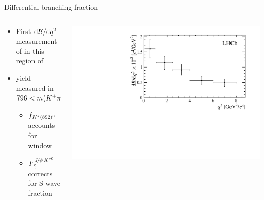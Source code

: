 \documentclass[aspectratio=1610]{beamer}
\def\KstarP  {\ensuremath{\kaon^{*}(892)^{0}}\xspace}
\begin{document}
\begin{frame}{Differential branching fraction}

\begin{mdframed}[linecolor=barcolor] 
\end{mdframed}

\begin{columns}
\begin{column}{0.5\textwidth}
\begin{itemize}
\item First $\mathrm{d}{\mathcal{B}}/\mathrm{d}{q^2}$ measurement of \BdToKpimm in this region of \mkpi 
\end{itemize}
\begin{itemize}
\item \BdToJPsiKstP yield measured in $796<m({{K}^+}{{\pi}^-})<996$\mevcc
\begin{itemize}
  \item $f_{\KstarP}$ accounts for \mkpi window
  \item $F_{\rm S}^{{{J\mskip -3mu/\mskip -2mu\psi\mskip 2mu}}{{K}^{*0}}}$ corrects for S-wave fraction
\end{itemize}
\end{itemize}
\end{column}
\begin{column}{0.5\textwidth}
\centering
\vspace{0.5cm}
\includegraphics[width=\textwidth]{figs/kpimm/bf/dbfdq2.pdf}
\end{column}
\end{columns}
\end{frame}
\end{document}
